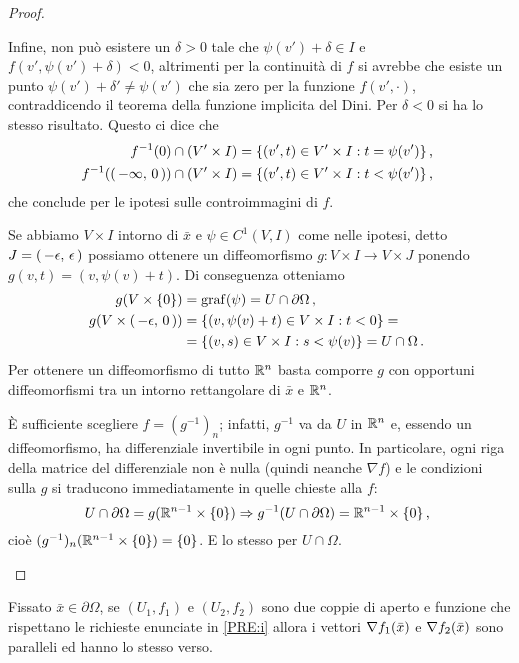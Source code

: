 \begin{proof}
\begin{description}
			Infine, non può esistere un $\delta>0$ tale che $\psi(v')+\delta\in I$ e
			$f(v',\psi(v')+\delta)<0$, altrimenti per la continuità di $f$ si avrebbe che esiste un punto $\psi(v')+\delta'\neq \psi(v')$
			che sia zero per la funzione $f(v',\cdot)$, contraddicendo il teorema della funzione implicita del Dini.
			Per $\delta<0$ si ha lo stesso risultato. Questo ci dice che 
			\begin{align*}
				f^{-1}(0)\cap (V'\times I)&=\{(v',t)\in V'\times I:t=\psi(v')\} \, \text{, }\\
				f^{-1}(\left(\,-\infty,\,0\,\right))\cap (V'\times I)&=\{(v',t)\in V'\times I:t<\psi(v')\}\, \text{, }
			\end{align*}
			che conclude per le ipotesi sulle controimmagini di $f$.
		\item [\ImplicationProof{PRE:iii}{PRE:ii}] Se abbiamo $V\times I$ intorno di $\bar x$ e $\psi\in C^1(V,I)$ come nelle ipotesi, detto $J=\left(\,-\epsilon,\,\epsilon\,\right)$
			possiamo ottenere un diffeomorfismo $g:V\times I \rightarrow V\times J$ ponendo $g(v,t)=(v,\psi(v)+t)$. 
			Di conseguenza otteniamo
			\begin{align*}
				g(V\times \{0\})&=\operatorname{graf}(\psi)=U\cap \partial \Omega \, \text{, }\\
				g(V\times \left(\,-\epsilon,\,0\,\right))&=\{(v,\psi(v)+t)\in V\times I:t<0\}=\\
												&=\{(v,s)\in V\times I:s<\psi(v)\}=U\cap \Omega\, \text{. }
			\end{align*}
			Per ottenere un diffeomorfismo di tutto $\mathbb R^n$ basta comporre $g$ con opportuni diffeomorfismi tra un intorno rettangolare
			di $\bar x$ e $\mathbb R^n$.
		\item [\ImplicationProof{PRE:ii}{PRE:i}] È sufficiente scegliere $f=(g^{-1})_n$; infatti, $g^{-1}$ va da $U$ in $\mathbb R^n$ e, essendo un diffeomorfismo, ha differenziale invertibile in ogni punto.
			In particolare, ogni riga della matrice del differenziale non è nulla (quindi neanche $\nabla f$) e le condizioni sulla $g$ si traducono immediatamente in quelle chieste alla $f$:
			\[
				U\cap \partial \Omega = g(\mathbb R^{n-1}\times\{0\}) \Rightarrow g^{-1}(U\cap \partial \Omega) = \mathbb R^{n-1}\times\{0\}\, \text{, }
			\]
			cioè $(g^{-1})_n(\mathbb R^{n-1}\times\{0\}) = \{0\}$. E lo stesso per $U\cap\Omega$.
	\end{description}
\end{proof}
\begin{lemma}\label{lemma:BuonaDefinizioneNormale}
	Fissato $\bar x\in\partial\Omega$, se $(U_1,f_1)$ e $(U_2,f_2)$ sono due coppie di aperto e funzione che rispettano le richieste enunciate in \ref{PRE:i} allora i vettori $\nabla f_1(\bar x)$ e $\nabla f_2(\bar x)$ sono paralleli ed hanno lo stesso verso.
\end{lemma}
